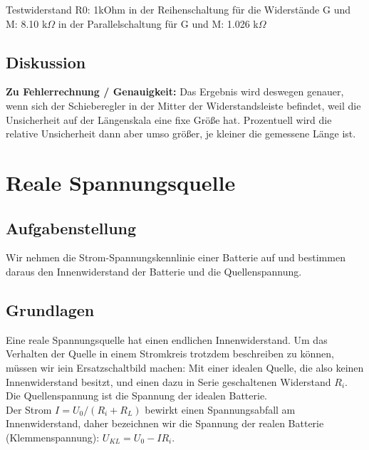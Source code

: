 \documentclass{article}
\begin{document}
Testwiderstand R0: 1kOhm
in der Reihenschaltung für die Widerstände G und M: 8.10 k$\Omega$
in der Parallelschaltung für G und M: 1.026 k$\Omega$
\subsection{Diskussion}
\textbf{Zu Fehlerrechnung / Genauigkeit:}
Das Ergebnis wird deswegen genauer, wenn sich der Schieberegler in der Mitter der Widerstandsleiste befindet, weil die Unsicherheit auf der Längenskala eine fixe Größe hat. Prozentuell wird die relative Unsicherheit dann aber umso größer, je kleiner die gemessene Länge ist. 



\newpage



\section{Reale Spannungsquelle}

\subsection{Aufgabenstellung}
Wir nehmen die Strom-Spannungskennlinie einer Batterie auf und bestimmen daraus den Innenwiderstand der Batterie und die Quellenspannung.


\subsection{Grundlagen}
Eine reale Spannungsquelle hat einen endlichen Innenwiderstand. Um das Verhalten der Quelle in einem Stromkreis trotzdem beschreiben zu können, müssen wir iein Ersatzschaltbild machen: Mit einer idealen Quelle, die also keinen Innenwiderstand besitzt, und einen dazu in Serie geschaltenen Widerstand $R_i$.\\
Die Quellenspannung ist die Spannung der idealen Batterie.\\
Der Strom $I=U_0/(R_i+R_L)$ bewirkt einen Spannungsabfall am Innenwiderstand, daher bezeichnen wir die Spannung der realen Batterie (Klemmenspannung): $U_{KL}=U_0-IR_i$.
\end{document}
